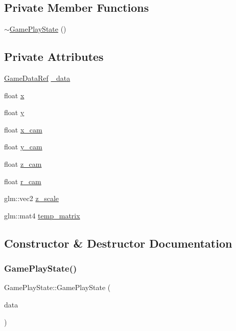 \subsection*{Private Member Functions}
\begin{DoxyCompactItemize}
\item 
\hyperlink{classGamePlayState_aaa1afd5f6e091e5cb5bda2fa82247d58}{$\sim$\+Game\+Play\+State} ()
\end{DoxyCompactItemize}
\subsection*{Private Attributes}
\begin{DoxyCompactItemize}
\item 
\hyperlink{game_8h_a513c9dd465a0df41dbb4daf40cc717c2}{Game\+Data\+Ref} \hyperlink{classGamePlayState_aab402d0ac13aa45c16e0f89bcfe7e963}{\+\_\+data}
\item 
float \hyperlink{classGamePlayState_a055feaf3b4acaaff53dddc571252c4e4}{x}
\item 
float \hyperlink{classGamePlayState_ae1da324a3664591e663d09a5b17f9007}{y}
\item 
float \hyperlink{classGamePlayState_a1f0c5c88f94177891ec0819628d0aa8c}{x\+\_\+cam}
\item 
float \hyperlink{classGamePlayState_ab69b90dcdbb3375687e6e3641d1654da}{y\+\_\+cam}
\item 
float \hyperlink{classGamePlayState_a3b25b85d41324ec556fe81a75bb1811f}{z\+\_\+cam}
\item 
float \hyperlink{classGamePlayState_a430ff4098f9f58fe0b6ab4fe154a89a0}{r\+\_\+cam}
\item 
glm\+::vec2 \hyperlink{classGamePlayState_a9bdc2e5899e9ca4e266019f646d2ba34}{z\+\_\+scale}
\item 
glm\+::mat4 \hyperlink{classGamePlayState_add3118e821461399143e4f2fd3520966}{temp\+\_\+matrix}
\end{DoxyCompactItemize}


\subsection{Constructor \& Destructor Documentation}
\mbox{\label{classGamePlayState_a189d187dd3caac0691e1862a89172223}} 
\subsubsection{\texorpdfstring{Game\+Play\+State()}{GamePlayState()}}
{\footnotesize\ttfamily Game\+Play\+State\+::\+Game\+Play\+State (\begin{DoxyParamCaption}\item[{\hyperlink{game_8h_a513c9dd465a0df41dbb4daf40cc717c2}{Game\+Data\+Ref}}]{data }\end{DoxyParamCaption})}

